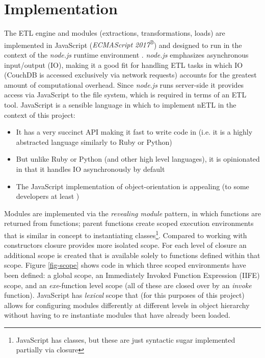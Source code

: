 \section{Implementation}
The ETL engine and modules (extractions, transformations, loads) are implemented in JavaScript (\textit{ECMAScript 2017\textsuperscript{®}}) \cite{ecmascript2017} and designed to run in the context of the \textit{node.js} runtime environment \cite{nodejs}. \textit{node.js} emphasizes asynchronous input/output (IO), making it a good fit for handling ETL tasks in which IO (CouchDB is accessed exclusively via network requests) accounts for the greatest amount of computational overhead. Since \textit{node.js} runs server-side it provides access via JavaScript to the file system, which is required in terms of an ETL tool. JavaScript is a sensible language in which to implement nETL in the context of this project:

\begin{itemize}
    \item It has a very succinct API making it fast to write code in (i.e. it is a highly abstracted language similarly to Ruby or Python)
    \item But unlike Ruby or Python (and other high level languages), it is opinionated in that it handles IO asynchronously by default
    \item The JavaScript implementation of object-orientation is appealing (to some developers at least \cite{jsBook})
\end{itemize}

Modules are implemented via the \textit{revealing module} pattern, in which functions are returned from functions; parent functions create scoped execution environments that is similar in concept to instantiating classes\footnote{JavaScript has classes, but these are just syntactic sugar implemented partially via closure}. Compared to working with constructors closure provides more isolated scope. For each level of closure an additional scope is created that is available solely to functions defined within that scope. Figure \ref{fig-scope} shows code in which three scoped environments have been defined: a global scope, an Immediately Invoked Function Expression (IIFE) scope, and an \textit{exe}-function level scope (all of these are closed over by an \textit{invoke} function). JavaScript has \textit{lexical} scope \cite{jsBook2} that (for this purposes of this project) allows for configuring modules differently at different levels in object hierarchy without having to re instantiate modules that have already been loaded.

